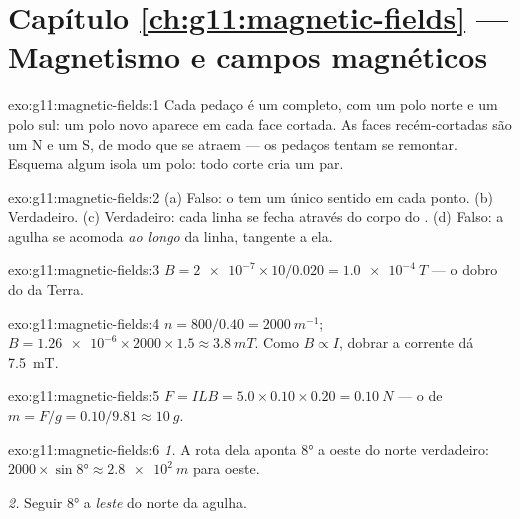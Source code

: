 \section*{Capítulo \ref{ch:g11:magnetic-fields} --- Magnetismo e campos magnéticos}

\begin{solution}{exo:g11:magnetic-fields:1}
Cada pedaço é um  completo, com um polo norte e um polo sul: um polo
novo aparece em cada face cortada. As faces recém-cortadas são um N e um
S, de modo que se atraem --- os pedaços tentam se remontar. Esquema
algum isola um polo: todo corte cria um par.
\end{solution}

\begin{solution}{exo:g11:magnetic-fields:2}
(a) Falso: o  tem um único sentido em cada ponto. (b) Verdadeiro.
(c) Verdadeiro: cada linha se fecha através do corpo do . (d) Falso: a
agulha se acomoda \emph{ao longo} da linha, tangente a ela.
\end{solution}

\begin{solution}{exo:g11:magnetic-fields:3}
$B = \num{2e-7} \times 10 / 0.020 = \qty{1.0e-4}{T}$ --- o dobro do 
da Terra.
\end{solution}

\begin{solution}{exo:g11:magnetic-fields:4}
$n = 800/0.40 = \qty{2000}{m^{-1}}$;
$B = \num{1.26e-6} \times 2000 \times 1.5 \approx \qty{3.8}{mT}$. Como
$B \propto I$, dobrar a corrente dá \qty{7.5}{mT}.
\end{solution}

\begin{solution}{exo:g11:magnetic-fields:5}
$F = ILB = 5.0 \times 0.10 \times 0.20 = \qty{0.10}{N}$ --- o  de
$m = F/g = 0.10/9.81 \approx \qty{10}{g}$.
\end{solution}

\begin{solution}{exo:g11:magnetic-fields:6}
\emph{1.} A rota dela aponta $\ang{8}$ a oeste do norte verdadeiro:
$2000 \times \sin\ang{8} \approx \qty{2.8e2}{m}$ para oeste.

\emph{2.} Seguir $\ang{8}$ a \emph{leste} do norte da agulha.
\end{solution}


